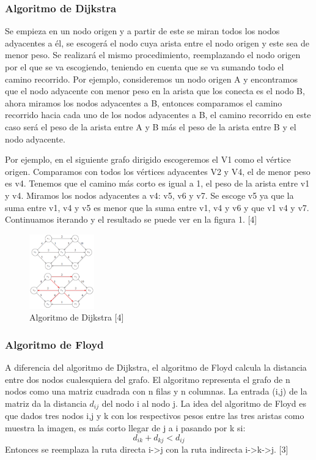 \documentclass[conference,compsoc]{IEEEtran}
\begin{document}
\subsubsection{Algoritmo de Dijkstra}
Se empieza en un nodo origen y a partir de este se miran todos los nodos adyacentes a él, se escogerá el nodo cuya arista entre el nodo origen y este sea de menor peso. Se realizará el mismo procedimiento, reemplazando el nodo origen por el que se va escogiendo, teniendo en cuenta que se va sumando todo el camino recorrido. Por ejemplo, consideremos un nodo origen A y encontramos que el nodo adyacente con menor peso en la arista que los conecta es el nodo B, ahora miramos los nodos adyacentes a B, entonces comparamos el camino recorrido hacia cada uno de los nodos adyacentes a B, el camino recorrido en este caso será el peso de la arista entre A y B más el peso de la arista entre B y el nodo adyacente. 

Por ejemplo, en el siguiente grafo dirigido escogeremos el V1 como el vértice origen. Comparamos con todos los vértices adyacentes V2 y V4, el de menor peso es v4. Tenemos que el camino más corto es igual a 1, el peso de la arista entre v1 y v4. Miramos los nodos adyacentes a v4: v5, v6 y v7. Se escoge v5 ya que la suma entre v1, v4 y v5 es menor que la suma entre v1, v4 y v6 y que v1 v4 y v7. Continuamos iterando y el resultado se puede ver en la figura 1. [4]

\begin{figure}[h]
    \centering
    \includegraphics[width=0.25\textwidth]{Problema1/PL1.png}
    \caption{Algoritmo de Dijkstra [4]}
    \label{fig:mesh1}
\end{figure}

\subsubsection{Algoritmo de Floyd}
A diferencia del algoritmo de Dijkstra, el algoritmo de Floyd calcula la distancia entre dos nodos cualesquiera del grafo. El algoritmo representa el grafo de n nodos como una matriz cuadrada  con n filas y n columnas. La entrada (i,j) de la matriz da la distancia $d_{ij}$ del nodo i al nodo j. La idea del algoritmo de Floyd es que dados tres nodos i,j y k con los respectivos pesos entre las tres aristas como muestra la imagen, es más corto llegar de j a i pasando por k si:
$$d_{ik} + d_{kj} <d_{ij}$$
Entonces se reemplaza la ruta directa i->j con la ruta indirecta i->k->j. [3]
\end{document}

